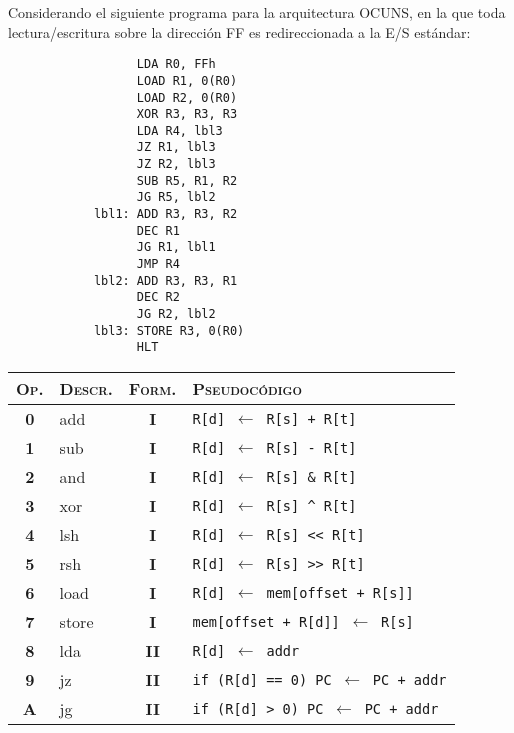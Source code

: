 \documentclass[12pt,a4paper]{article}
\begin{document}
 Considerando el siguiente programa para la arquitectura OCUNS, en la que toda lectura/escritura sobre la dirección FF es redireccionada a la E/S estándar: \\ [2.5mm]
\begin{small}
	\begin{minipage}{.4\textwidth}
		\begin{verbatim}
			      LDA R0, FFh
			      LOAD R1, 0(R0)
			      LOAD R2, 0(R0)
			      XOR R3, R3, R3
			      LDA R4, lbl3
			      JZ R1, lbl3
			      JZ R2, lbl3
			      SUB R5, R1, R2
			      JG R5, lbl2
			lbl1: ADD R3, R3, R2
			      DEC R1
			      JG R1, lbl1
			      JMP R4
			lbl2: ADD R3, R3, R1
			      DEC R2
			      JG R2, lbl2
			lbl3: STORE R3, 0(R0)
			      HLT
		\end{verbatim}
	\end{minipage}
	\begin{minipage}{.6\textwidth}	
		\begin{tabular}{|c|l|c|l|}\hline
			\textsc{Op.} & \textsc{Descr.} & \textsc{Form.} & \textsc{Pseudocódigo} \\ \hline
			\textbf{0} & \textsf{add} & \textbf{I} & \texttt{R[d] $\leftarrow$ R[s] + R[t]} \\
			\textbf{1} & \textsf{sub} & \textbf{I} & \texttt{R[d] $\leftarrow$ R[s] - R[t]} \\
			\textbf{2} & \textsf{and} & \textbf{I} & \texttt{R[d] $\leftarrow$ R[s] \& R[t]} \\
			\textbf{3} & \textsf{xor} & \textbf{I} & \texttt{R[d] $\leftarrow$ R[s] \^{} R[t]} \\
			\textbf{4} & \textsf{lsh} & \textbf{I} & \texttt{R[d] $\leftarrow$ R[s] <{}<{} R[t]} \\
			\textbf{5} & \textsf{rsh}  & \textbf{I} & \texttt{R[d] $\leftarrow$ R[s] >{}>{} R[t]} \\
			\textbf{6} & \textsf{load}  & \textbf{I} & \texttt{R[d] $\leftarrow$ mem[offset + R[s]]} \\
			\textbf{7} & \textsf{store} & \textbf{I} & \texttt{mem[offset + R[d]] $\leftarrow$ R[s]} \\
			\textbf{8} & \textsf{lda}   & \textbf{II} & \texttt{R[d] $\leftarrow$ addr} \\
			\textbf{9} & \textsf{jz}    & \textbf{II} & \texttt{if (R[d] == 0) PC $\leftarrow$ PC + addr} \\
			\textbf{A} & \textsf{jg}    & \textbf{II} & \texttt{if (R[d] >{} 0) PC $\leftarrow$ PC + addr} \\

\end{tabular}
\end{minipage}
\end{small}
\end{document}
